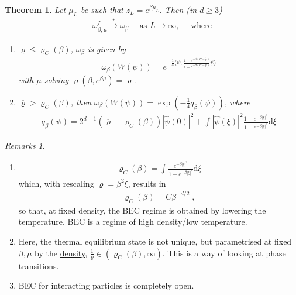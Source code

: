 \documentclass[
a4paper, %
11pt, %
onecolumn, %
openany, %
]{memoir}
\theoremstyle{definition}
\theoremstyle{remark}
\newtheorem{remarks}{Remarks}[chapter]
\theoremstyle{plain}
\newtheorem{theorem}{Theorem}[chapter]
\begin{document}
\begin{theorem}
	Let $\mu_L$ be such that $z_L=e^{\beta\mu_L}$. Then (in $d\geq 3$) \begin{align}
	\omega_{\beta,\mu}^L\overset{*}{\longrightarrow}\omega_{\beta}\quad \text{ as }L\rightarrow\infty,\quad \text{ where}
	\end{align}\begin{enumerate}
		\item $\overline{\varrho}\leq \varrho_C(\beta)$, $\omega_{\beta}$ is given by \begin{align}\omega_{\beta}(W(\psi))=e^{-\frac{1}{4}\langle \psi, \frac{\mathds{1}+e^{-\beta (H-\overline{\mu})}}{\mathds{1}-e^{-\beta(H-\overline{\mu})}}\psi\rangle}\end{align} with $\overline{\mu}$ solving $\varrho(\beta,e^{\beta\mu})=\overline{\varrho}$.
		\item $\overline{\varrho}>\varrho_C(\beta)$, then $\omega_{\beta}(W(\psi))=\exp(-\frac{1}{4}q_{\beta}(\psi))$, where\begin{align}
		q_{\beta}(\psi)=2^{d+1}(\overline{\varrho}-\varrho_C(\beta))|\hat{\psi}(0)|^2+\int|\hat{\psi}(\xi)|^2\frac{1+e^{-\beta|\xi|^2}}{1-e^{-\beta|\xi|^2}}\mathrm{d}\xi\end{align}
	\end{enumerate}
\end{theorem}
\begin{remarks}
	\begin{enumerate}
		\item \begin{align}\varrho_C(\beta)=\int\frac{e^{-\beta|\xi|^2}}{1-e^{-\beta|\xi|^2}}\mathrm{d}\xi\end{align} which, with rescaling $\varrho=\beta^2\xi$, results in \begin{align}
		\varrho_C(\beta)=C\beta^{-d/2}\;,
		\end{align}
		so that, at fixed density, the BEC regime is obtained by lowering the temperature. BEC is a regime of high density/low temperature.
		\item Here, the thermal equilibrium state is not unique, but parametrised at fixed $\beta,\mu$ by the \underline{density}, $\frac{1}{\varrho}\in (\varrho_C(\beta),\infty)$. This is a way of looking at phase transitions.
		\item BEC for interacting particles is completely open.
	\end{enumerate}
\end{remarks}
\end{document}
